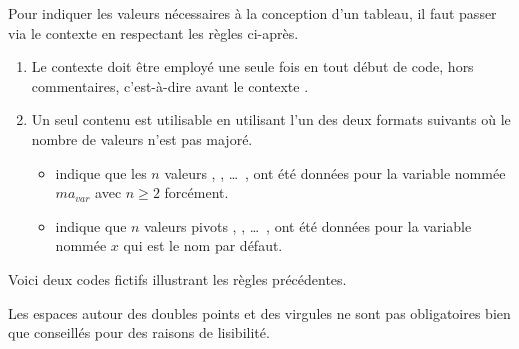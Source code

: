 Pour indiquer les valeurs nécessaires à la conception d'un tableau, il faut passer via le contexte  en respectant les règles ci-après.
%
\begin{enumerate}
    \item Le contexte  doit être employé une seule fois en tout début de code, hors commentaires, c'est-à-dire avant le contexte .


    \item Un seul contenu est utilisable en utilisant l'un des deux formats suivants où le nombre de valeurs n'est pas majoré.
    \begin{itemize}
        \item {} indique que les $n$ valeurs  ,  , \dots\ ,  ont été données pour la variable nommée $ma_{var}$ avec $n \geq 2$ forcément.

        \item {} indique que $n$ valeurs pivots  ,  , \dots\ ,  ont été données pour la variable nommée $x$ qui est le nom par défaut.
    \end{itemize}
\end{enumerate}


\medskip


Voici deux codes fictifs illustrant les règles précédentes.
\begin{multicols}{2}

\end{multicols}




\begin{tdocnote}
    Les espaces autour des doubles points et des virgules ne sont pas obligatoires bien que conseillés pour des raisons de lisibilité.
\end{tdocnote}



